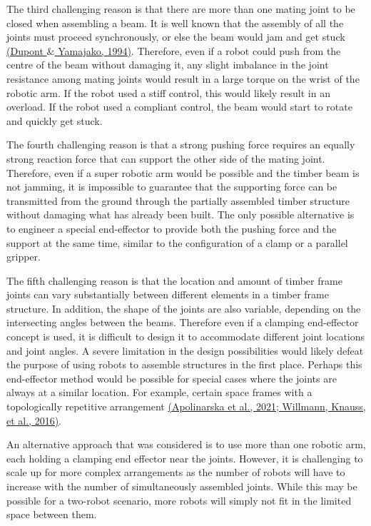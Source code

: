 The third challenging reason is that there are more than one mating joint to be closed when assembling a beam. It is well known that the assembly of all the joints must proceed synchronously, or else the beam would jam and get stuck \href{https://www.zotero.org/google-docs/?tb7dgL}{(Dupont $\&$ Yamajako, 1994)}. Therefore, even if a robot could push from the centre of the beam without damaging it, any slight imbalance in the joint resistance among mating joints would result in a large torque on the wrist of the robotic arm. If the robot used a stiff control, this would likely result in an overload. If the robot used a compliant control, the beam would start to rotate and quickly get stuck. 

The fourth challenging reason is that a strong pushing force requires an equally strong reaction force that can support the other side of the mating joint. Therefore, even if a super robotic arm would be possible and the timber beam is not jamming, it is impossible to guarantee that the supporting force can be transmitted from the ground through the partially assembled timber structure without damaging what has already been built. The only possible alternative is to engineer a special end-effector to provide both the pushing force and the support at the same time, similar to the configuration of a clamp or a parallel gripper.

The fifth challenging reason is that the location and amount of timber frame joints can vary substantially between different elements in a timber frame structure. In addition, the shape of the joints are also variable, depending on the intersecting angles between the beams. Therefore even if a clamping end-effector concept is used, it is difficult to design it to accommodate different joint locations and joint angles. A severe limitation in the design possibilities would likely defeat the purpose of using robots to assemble structures in the first place. Perhaps this end-effector method would be possible for special cases where the joints are always at a similar location. For example, certain space frames with a topologically repetitive arrangement \href{https://www.zotero.org/google-docs/?UUeya7}{(Apolinarska et al., 2021; Willmann, Knauss, et al., 2016)}. 

An alternative approach that was considered is to use more than one robotic arm, each holding a clamping end effector near the joints. However, it is challenging to scale up for more complex arrangements as the number of robots will have to increase with the number of simultaneously assembled joints. While this may be possible for a two-robot scenario, more robots will simply not fit in the limited space between them.

